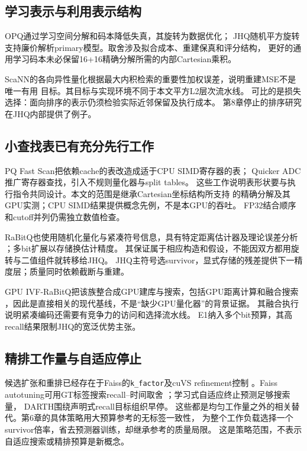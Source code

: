 \subsection{学习表示与利用表示结构}
OPQ通过学习空间分解和码本降低失真\cite{opq}，其旋转为数据优化；
JHQ随机平方旋转支持廉价解析primary模型。取舍涉及拟合成本、重建保真和评分结构，
更好的通用学习码本未必保留16+16精确分解所需的内部Cartesian乘积。

ScaNN的各向异性量化根据最大内积检索的重要性加权误差，说明重建MSE不是唯一有用
目标\cite{scann}。其目标与实现环境不同于本文平方L2层次流水线。
可比的是损失选择：面向排序的表示仍须检验实际近邻保留及执行成本。
第8章停止的排序研究在JHQ内部提供了例子。

\subsection{小查找表已有充分先行工作}
PQ Fast Scan把依赖cache的表改造成适于CPU SIMD寄存器的表\cite{fastscan}；
Quicker ADC推广寄存器查找，引入不规则量化器与split tables\cite{quickeradc}。
这些工作说明表形状要与执行指令共同设计。本文的范围是继承Cartesian坐标结构所支持
的精确分解及其GPU实测；CPU SIMD结果提供概念先例，不是本GPU的吞吐。
FP32结合顺序和cutoff并列仍需独立数值检查。

RaBitQ也使用随机化量化与紧凑符号信息，具有特定距离估计器及理论误差分析
\cite{rabitq}；多bit扩展以存储换估计精度\cite{rabitq_multi}。
其保证属于相应构造和假设，不能因双方都用旋转与二值组件就转移给JHQ。
JHQ主符号选survivor，显式存储的残差提供下一精度层；质量同时依赖截断与重建。

GPU IVF-RaBitQ把该族整合成GPU建库与搜索，包括GPU距离计算和融合搜索
\cite{ivfrabitq}，因此是直接相关的现代基线，不是“缺少GPU量化器”的背景证据。
其融合执行说明紧凑编码还需要有竞争力的访问和选择流水线。
E1纳入多个bit预算，其高recall结果限制JHQ的宽泛优势主张。

\subsection{精排工作量与自适应停止}
候选扩张和重排已经存在于Faiss的\texttt{k\_factor}及cuVS refinement控制
\cite{faiss_refine,cuvs_refinement}。Faiss autotuning可用GT标签搜索recall--时间取舍
\cite{faiss_autotune}；学习式自适应终止预测足够搜索量\cite{li_termination}，
DARTH围绕声明式recall目标组织早停\cite{darth}。
这些都是均匀工作量之外的相关替代。第6章的具体策略用大预算参考的无标签一致性，
为整个工作负载选择一个survivor倍率，省去预测器训练，却继承参考的质量局限。
这是策略范围，不表示自适应搜索或精排预算是新概念。
